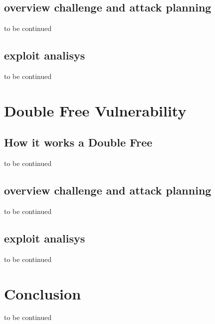 \documentclass{report}
\begin{document}
    \section{overview challenge and attack planning}
    to be continued
    \clearpage
    \section{exploit analisys}
    to be continued
    \clearpage
    \chapter{Double Free Vulnerability}
    \section{How it works a Double Free}
    to be continued    
    \clearpage
    \section{overview challenge and attack planning}
    to be continued
    \clearpage
    \section{exploit analisys}
    to be continued
    \clearpage
    \chapter{Conclusion}
    to be continued
    \clearpage
\end{document}
